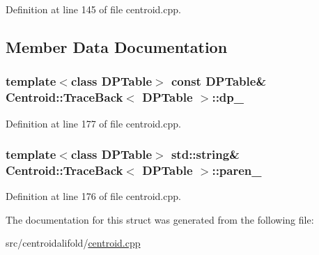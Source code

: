 Definition at line 145 of file centroid.\+cpp.



\subsection{Member Data Documentation}
\hypertarget{struct_centroid_1_1_trace_back_a4def6deb41a8a79484df386bcee24925}{
\subsubsection[{dp\+\_\+}]{\setlength{\rightskip}{0pt plus 5cm}template$<$class D\+P\+Table$>$ const D\+P\+Table\& {\bf Centroid\+::\+Trace\+Back}$<$ D\+P\+Table $>$\+::dp\+\_\+}}\label{struct_centroid_1_1_trace_back_a4def6deb41a8a79484df386bcee24925}


Definition at line 177 of file centroid.\+cpp.

\hypertarget{struct_centroid_1_1_trace_back_a7470cf94b706bec16bb6ec711c7640db}{
\subsubsection[{paren\+\_\+}]{\setlength{\rightskip}{0pt plus 5cm}template$<$class D\+P\+Table$>$ std\+::string\& {\bf Centroid\+::\+Trace\+Back}$<$ D\+P\+Table $>$\+::paren\+\_\+}}\label{struct_centroid_1_1_trace_back_a7470cf94b706bec16bb6ec711c7640db}


Definition at line 176 of file centroid.\+cpp.



The documentation for this struct was generated from the following file\+:\begin{DoxyCompactItemize}
\item 
src/centroidalifold/\hyperlink{centroid_8cpp}{centroid.\+cpp}\end{DoxyCompactItemize}
